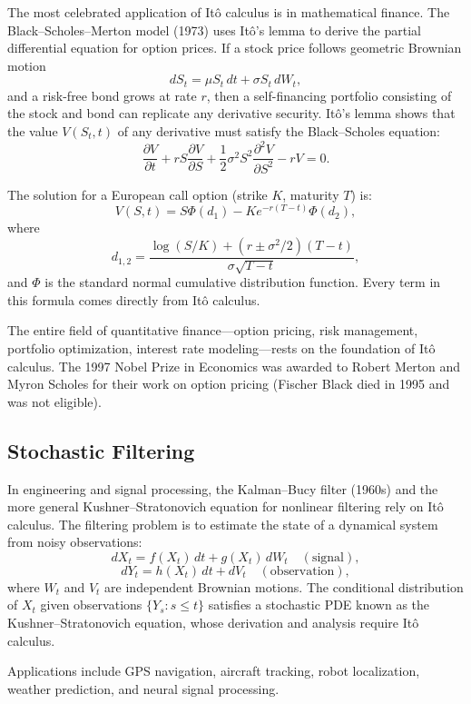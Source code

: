 The most celebrated application of It\^{o} calculus is in mathematical finance. The Black--Scholes--Merton model (1973) uses It\^{o}'s lemma to derive the partial differential equation for option prices. If a stock price follows geometric Brownian motion
\[
dS_t = \mu S_t \, dt + \sigma S_t \, dW_t,
\]
and a risk-free bond grows at rate \(r\), then a self-financing portfolio consisting of the stock and bond can replicate any derivative security. It\^{o}'s lemma shows that the value \(V(S_t, t)\) of any derivative must satisfy the Black--Scholes equation:
\[
\frac{\partial V}{\partial t} + rS \frac{\partial V}{\partial S} + \frac12 \sigma^2 S^2 \frac{\partial^2 V}{\partial S^2} - rV = 0.
\]

The solution for a European call option (strike \(K\), maturity \(T\)) is:
\[
V(S,t) = S\Phi(d_1) - Ke^{-r(T-t)}\Phi(d_2),
\]
where
\[
d_{1,2} = \frac{\log(S/K) + (r \pm \sigma^2/2)(T-t)}{\sigma\sqrt{T-t}},
\]
and \(\Phi\) is the standard normal cumulative distribution function. Every term in this formula comes directly from It\^{o} calculus.

The entire field of quantitative finance---option pricing, risk management, portfolio optimization, interest rate modeling---rests on the foundation of It\^{o} calculus. The 1997 Nobel Prize in Economics was awarded to Robert Merton and Myron Scholes for their work on option pricing (Fischer Black died in 1995 and was not eligible).

\subsection{Stochastic Filtering}

In engineering and signal processing, the Kalman--Bucy filter (1960s) and the more general Kushner--Stratonovich equation for nonlinear filtering rely on It\^{o} calculus. The filtering problem is to estimate the state of a dynamical system from noisy observations:
\[
dX_t = f(X_t)\,dt + g(X_t)\,dW_t \quad (\text{signal}),
\]
\[
dY_t = h(X_t)\,dt + dV_t \quad (\text{observation}),
\]
where \(W_t\) and \(V_t\) are independent Brownian motions. The conditional distribution of \(X_t\) given observations \(\{Y_s : s \leq t\}\) satisfies a stochastic PDE known as the Kushner--Stratonovich equation, whose derivation and analysis require It\^{o} calculus.

Applications include GPS navigation, aircraft tracking, robot localization, weather prediction, and neural signal processing.

